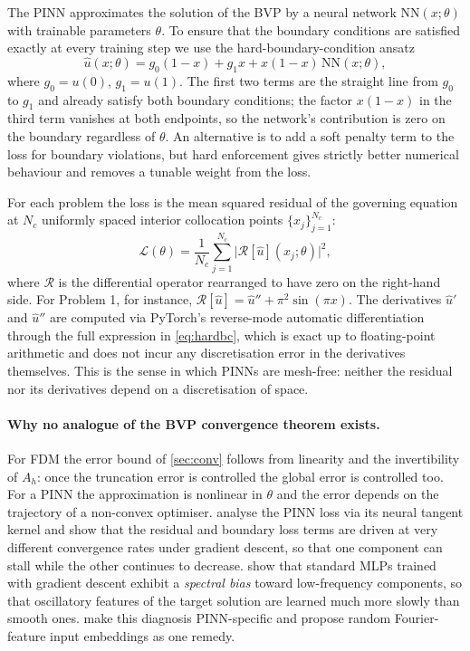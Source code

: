 \documentclass[11pt]{article}
\theoremstyle{plain}
\theoremstyle{remark}
\newcommand{\Ah}{A_h}
\begin{document}
The PINN approximates the solution of the BVP by a neural network
$\text{NN}(x;\theta)$ with trainable parameters $\theta$. To ensure that
the boundary conditions are satisfied exactly at every training step
we use the hard-boundary-condition ansatz
\begin{equation}
\hat{u}(x;\theta) = g_0 (1 - x) + g_1 x + x (1 - x)\,\text{NN}(x;\theta),
\label{eq:hardbc}
\end{equation}
where $g_0 = u(0)$, $g_1 = u(1)$. The first two terms are the straight
line from $g_0$ to $g_1$ and already satisfy both boundary conditions; the
factor $x(1-x)$ in the third term vanishes at both endpoints, so the
network's contribution is zero on the boundary regardless of $\theta$. An
alternative is to add a soft penalty term to the loss for boundary
violations, but hard enforcement gives strictly better numerical behaviour
and removes a tunable weight from the loss.

For each problem the loss is the mean squared residual of the governing
equation at $N_c$ uniformly spaced interior collocation points
$\{x_j\}_{j=1}^{N_c}$:
\begin{equation}
\mathcal{L}(\theta) = \frac{1}{N_c} \sum_{j=1}^{N_c}
  \bigl| \mathcal{R}[\hat{u}](x_j;\theta) \bigr|^2,
\label{eq:loss}
\end{equation}
where $\mathcal{R}$ is the differential operator rearranged to have zero
on the right-hand side. For Problem 1, for instance,
$\mathcal{R}[\hat{u}] = \hat{u}'' + \pi^2 \sin(\pi x)$. The derivatives
$\hat{u}'$ and $\hat{u}''$ are computed via PyTorch's reverse-mode
automatic differentiation through the full expression in \cref{eq:hardbc},
which is exact up to floating-point arithmetic and does not incur any
discretisation error in the derivatives themselves. This is the sense
in which PINNs are mesh-free: neither the residual nor its derivatives
depend on a discretisation of space.

\paragraph{Why no analogue of the BVP convergence theorem exists.} For
FDM the error bound of \cref{sec:conv} follows from linearity and the
invertibility of $\Ah$: once the truncation error is controlled the
global error is controlled too. For a PINN the approximation is
nonlinear in $\theta$ and the error depends on the trajectory of a
non-convex optimiser. \citet{wang2022} analyse the PINN loss via its
neural tangent kernel and show that the residual and boundary loss terms
are driven at very different convergence rates under gradient descent, so
that one component can stall while the other continues to decrease.
\citet{rahaman2019} show that standard MLPs trained with gradient descent
exhibit a \emph{spectral bias} toward low-frequency components, so that
oscillatory features of the target solution are learned much more slowly
than smooth ones. \citet{wang2021eigenvector} make this diagnosis
PINN-specific and propose random Fourier-feature input embeddings
\citep{tancik2020} as one remedy.
\end{document}
